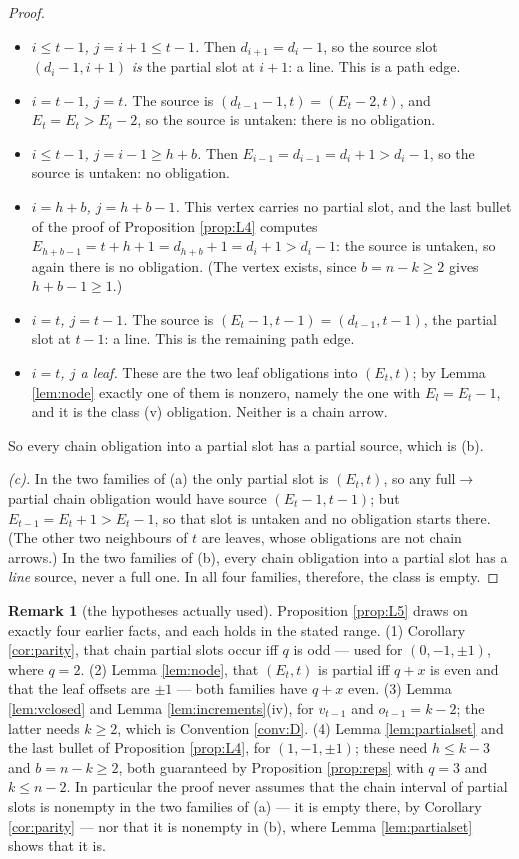 \documentclass[reqno]{amsart}
\theoremstyle{plain}
\theoremstyle{definition}
\newtheorem{remark}[theorem]{Remark}
\begin{document}
\begin{proof}
\begin{itemize}\itemsep1pt
\item \emph{$i\le t-1$, $j=i+1\le t-1$.}  Then $d_{i+1}=d_i-1$, so the source
slot $(d_i-1,i+1)$ \emph{is} the partial slot at $i+1$: a line.  This is a
path edge.
\item \emph{$i=t-1$, $j=t$.}  The source is $(d_{t-1}-1,t)=(E_t-2,t)$, and
$E_t=E_t>E_t-2$, so the source is untaken: there is no obligation.
\item \emph{$i\le t-1$, $j=i-1\ge h+b$.}  Then $E_{i-1}=d_{i-1}
=d_i+1>d_i-1$, so the source is untaken: no obligation.
\item \emph{$i=h+b$, $j=h+b-1$.}  This vertex carries no partial slot, and the
last bullet of the proof of Proposition \ref{prop:L4} computes
$E_{h+b-1}=t+h+1=d_{h+b}+1=d_i+1>d_i-1$: the source is untaken, so
again there is no obligation.  (The vertex exists, since $b=n-k\ge2$ gives
$h+b-1\ge1$.)
\item \emph{$i=t$, $j=t-1$.}  The source is $(E_t-1,t-1)=(d_{t-1},t-1)$, the
partial slot at $t-1$: a line.  This is the remaining path edge.
\item \emph{$i=t$, $j$ a leaf.}  These are the two leaf obligations into
$(E_t,t)$; by Lemma \ref{lem:node} exactly one of them is nonzero, namely the
one with $E_l=E_t-1$, and it is the class \textup{(v)} obligation.  Neither is
a chain arrow.
\end{itemize}
So every chain obligation into a partial slot has a partial source, which is
(b).

\emph{(c).}  In the two families of (a) the only partial slot is $(E_t,t)$, so
any full$\to$partial chain obligation would have source $(E_t-1,t-1)$; but
$E_{t-1}=E_t+1>E_t-1$, so that slot is untaken and no obligation
starts there.  (The other two neighbours of $t$ are leaves, whose obligations
are not chain arrows.)  In the two families of (b), every chain obligation
into a partial slot has a \emph{line} source, never a full one.  In all four
families, therefore, the class is empty.
\end{proof}

\begin{remark}[the hypotheses actually used]\label{rem:L5hyp}
Proposition \ref{prop:L5} draws on exactly four earlier facts, and each holds
in the stated range.  (1) Corollary \ref{cor:parity}, that chain partial slots
occur iff $q$ is odd --- used for $(0,-1,\pm1)$, where $q=2$.  (2) Lemma
\ref{lem:node}, that $(E_t,t)$ is partial iff $q+x$ is even and that the leaf
offsets are $\pm1$ --- both families have $q+x$ even.  (3) Lemma
\ref{lem:vclosed} and Lemma \ref{lem:increments}(iv), for $v_{t-1}$ and
$o_{t-1}=k-2$; the latter needs $k\ge2$, which is Convention \ref{conv:D}.
(4) Lemma \ref{lem:partialset} and the last bullet of Proposition
\ref{prop:L4}, for $(1,-1,\pm1)$; these need $h\le k-3$ and $b=n-k\ge2$, both
guaranteed by Proposition \ref{prop:reps} with $q=3$ and $k\le n-2$.  In
particular the proof never assumes that the chain interval of partial slots is
nonempty in the two families of (a) --- it is empty there, by Corollary
\ref{cor:parity} --- nor that it is nonempty in (b), where Lemma
\ref{lem:partialset} shows that it is.
\end{remark}
\end{document}
